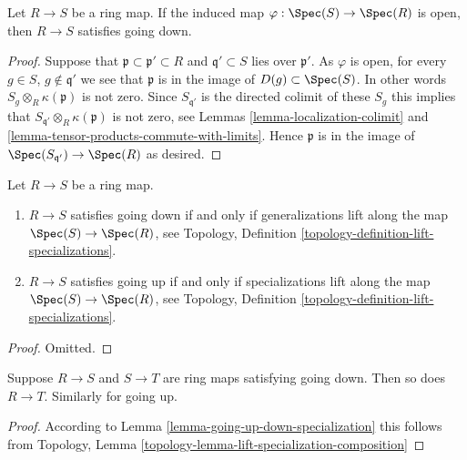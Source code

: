 \begin{lemma}
\label{lemma-open-going-down}
Let $R \to S$ be a ring map. If the induced map
$\varphi : \Spec(S) \to \Spec(R)$ is open, then
$R \to S$ satisfies going down.
\end{lemma}

\begin{proof}
Suppose that $\mathfrak p \subset \mathfrak p' \subset R$ and
$\mathfrak q' \subset S$ lies over $\mathfrak p'$. As $\varphi$ is open,
for every $g \in S$, $g \not \in \mathfrak q'$ we see that $\mathfrak p$
is in the image of $D(g) \subset \Spec(S)$. In other words
$S_g \otimes_R \kappa(\mathfrak p)$ is not zero. Since $S_{\mathfrak q'}$
is the directed colimit of these $S_g$ this implies
that $S_{\mathfrak q'} \otimes_R \kappa(\mathfrak p)$ is not
zero, see
Lemmas \ref{lemma-localization-colimit} and
\ref{lemma-tensor-products-commute-with-limits}.
Hence $\mathfrak p$ is in the image of
$\Spec(S_{\mathfrak q'}) \to \Spec(R)$ as desired.
\end{proof}

\begin{lemma}
\label{lemma-going-up-down-specialization}
Let $R \to S$ be a ring map.
\begin{enumerate}
\item $R \to S$ satisfies going down if and only if
generalizations lift along the map $\Spec(S) \to \Spec(R)$,
see Topology, Definition \ref{topology-definition-lift-specializations}.
\item $R \to S$ satisfies going up if and only if
specializations lift along the map $\Spec(S) \to \Spec(R)$,
see Topology, Definition \ref{topology-definition-lift-specializations}.
\end{enumerate}
\end{lemma}

\begin{proof}
Omitted.
\end{proof}

\begin{lemma}
\label{lemma-going-up-down-composition}
Suppose $R \to S$ and $S \to T$ are ring maps satisfying
going down. Then so does $R \to T$. Similarly for going up.
\end{lemma}

\begin{proof}
According to Lemma \ref{lemma-going-up-down-specialization}
this follows from
Topology, Lemma \ref{topology-lemma-lift-specialization-composition}
\end{proof}

